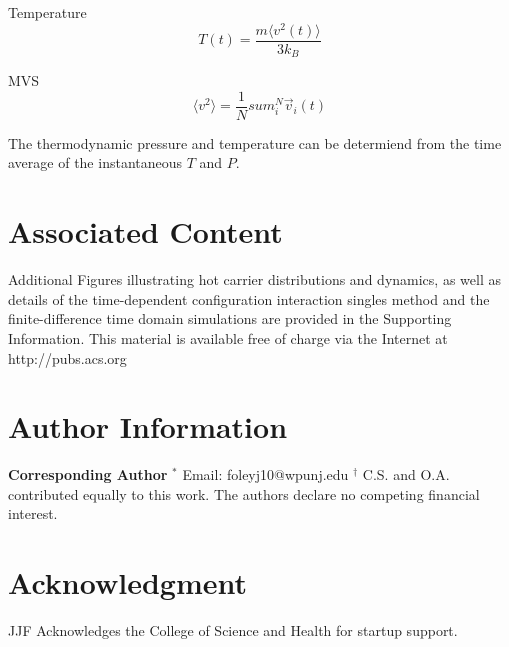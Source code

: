 \documentclass[journal=jpclcd,manuscript=article]{achemso}
\begin{document}
Temperature
\begin{equation}
T(t) = \frac{ m \langle v^2 (t) \rangle }{3 k_B}
\end{equation}

MVS
\begin{equation}
\langle v^2 \rangle = \frac{1}{N} sum_i^N \vec{v}_i(t)
\end{equation}

The thermodynamic pressure and temperature can be determiend from the time average of
the instantaneous $T$ and $P$.  


\section{Associated Content}
Additional Figures illustrating hot carrier distributions and dynamics, as well as details of the time-dependent
configuration interaction singles method and the finite-difference time domain simulations are provided in the Supporting 
Information.  This material is available free of charge via the Internet at http://pubs.acs.org

\section{Author Information}
{\bf Corresponding Author}
$^*$ Email: foleyj10@wpunj.edu
\newline
$^{\dagger}$  C.S. and O.A. contributed equally to this work.
\newline
The authors declare no competing financial interest.

\section{Acknowledgment}
JJF Acknowledges the College of Science and Health for startup support.


 
\end{document}
